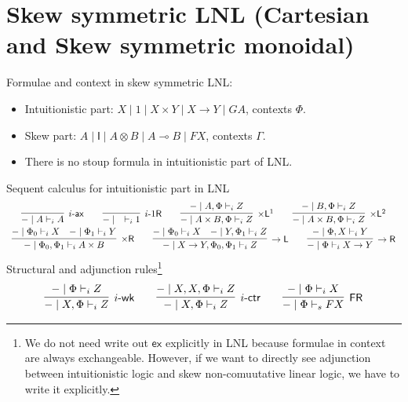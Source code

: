 \documentclass{article}
\newcommand{\ax}{\mathsf{ax}}
\newcommand{\ot}{\otimes}
\newcommand{\lolli}{\multimap}
\newcommand{\I}{\mathsf{I}}
\newcommand{\fr}{\mathsf{FR}}
\newcommand{\td}{\text{-}}
\newcommand{\tms}{\times}
\newcommand{\tmsr}{\times \mathsf{R}}
\newcommand{\tmslf}{\times \mathsf{L}^{1}}
\newcommand{\tmsls}{\times \mathsf{L}^{2}}
\newcommand{\rar}{\rightarrow}
\newcommand{\rarr}{\rightarrow \mathsf{R}}
\newcommand{\rarl}{\rightarrow \mathsf{L}}
\newcommand{\wk}{\mathsf{wk}}
\newcommand{\ctr}{\mathsf{ctr}}
\newcommand{\ex}{\mathsf{ex}}
\begin{document}
 \section*{Skew symmetric LNL (Cartesian and Skew symmetric monoidal)}
 Formulae and context in skew symmetric LNL:
 \begin{itemize}
   \item Intuitionistic part: $X \mid 1 \mid X \tms Y \mid X \rar Y \mid GA$, contexts $\Phi$.
   \item Skew part: $A \mid \I \mid A \ot B \mid A \lolli B \mid FX$, contexts $\Gamma$.
   \item There is no stoup formula in intuitionistic part of LNL.
 \end{itemize}
 Sequent calculus for intuitionistic part in LNL
 \begin{displaymath}
   \begin{array}{cc}
     \infer[i\td\ax]{- \mid A \vdash_{i} A}{}
     \qquad
     \infer[i\td 1\mathsf{R}]{- \mid \quad \vdash_{i} 1}{}
     \qquad
     \infer[\tmslf]{- \mid A \tms B , \Phi \vdash_{i} Z}{- \mid A,  \Phi \vdash_{i} Z}
     \qquad
     \infer[\tmsls]{- \mid A \tms B , \Phi \vdash_{i} Z}{- \mid B,  \Phi \vdash_{i} Z}
     \\
     \infer[\tmsr]{- \mid \Phi_{0} , \Phi_{1} \vdash_{i} A \tms B}{
      \deduce{- \mid \Phi_{0} \vdash_{i} X}{}
      &
      \deduce{- \mid \Phi_{1} \vdash_{i} Y}{}
     }
     \qquad
     \infer[\rarl]{- \mid X \rar Y , \Phi_{0} , \Phi_{1} \vdash_{i} Z}{
      \deduce{- \mid \Phi_{0} \vdash_{i} X}{}
      &
      \deduce{- \mid Y , \Phi_{1} \vdash_{i} Z}{}
     }
     \qquad
     \infer[\rarr]{- \mid \Phi \vdash_{i} X \rar Y}{- \mid \Phi , X \vdash_{i} Y}
   \end{array}
 \end{displaymath}
 Structural and adjunction rules\footnote{We do not need write out $\ex$ explicitly in LNL because formulae in context are always exchangeable. However, if we want to directly see adjunction between intuitionistic logic and skew non-comuutative linear logic, we have to write it explicitly.}
 \begin{displaymath}
   \begin{array}{cc}
   \infer[i\td\wk]{- \mid X, \Phi \vdash_{i} Z}{- \mid \Phi \vdash_{i} Z}
   \qquad
   \infer[i\td\ctr]{- \mid X , \Phi \vdash_{i} Z}{- \mid X , X , \Phi \vdash_{i} Z}
   \qquad
   \infer[\fr]{- \mid \Phi \vdash_{s} F X}{- \mid \Phi \vdash_{i} X}
   \end{array}
 \end{displaymath}
\end{document}
